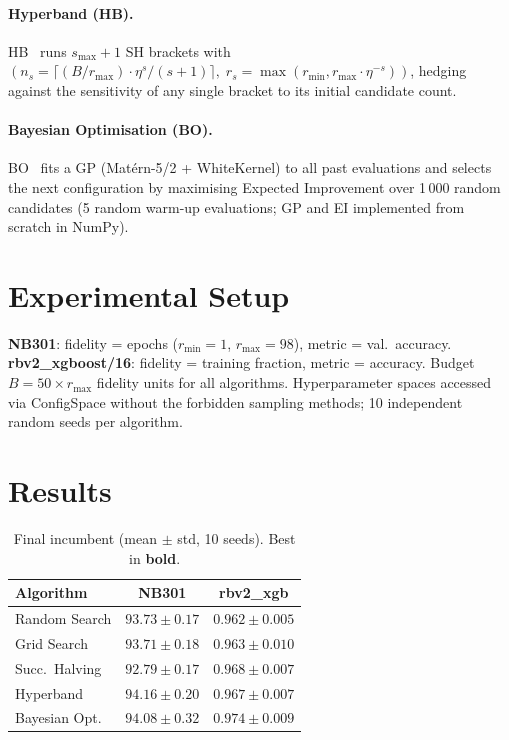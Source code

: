 \documentclass{AIM_report}
\begin{document}
\paragraph{Hyperband (HB).}
HB~\cite{li2018hyperband} runs $s_{\max}{+}1$ SH brackets with
$(n_s{=}\lceil(B/r_{\max})\cdot\eta^s/(s{+}1)\rceil,\;
r_s{=}\max(r_{\min}, r_{\max}{\cdot}\eta^{-s}))$,
hedging against the sensitivity of any single bracket to its initial
candidate count.

\paragraph{Bayesian Optimisation (BO).}
BO~\cite{snoek2012practical} fits a GP (Mat\'{e}rn-5/2 + WhiteKernel)
to all past evaluations and selects the next configuration by maximising
Expected Improvement over 1\,000 random candidates (5 random warm-up
evaluations; GP and EI implemented from scratch in NumPy).

\section{Experimental Setup}

\textbf{NB301}: fidelity = epochs ($r_{\min}{=}1$, $r_{\max}{=}98$),
metric = val.\ accuracy.
\textbf{rbv2\_xgboost/16}: fidelity = training fraction, metric = accuracy.
Budget $B{=}50{\times}r_{\max}$ fidelity units for all algorithms.
Hyperparameter spaces accessed via ConfigSpace without the forbidden
sampling methods; 10 independent random seeds per algorithm.

\section{Results}

\begin{table}[h]
  \centering
  \renewcommand{\tabcolsep}{4pt}
  \renewcommand{\arraystretch}{1.05}
  \caption{Final incumbent (mean $\pm$ std, 10 seeds). Best in \textbf{bold}.}
  \label{tab:results}
  \small
  \begin{tabular}{lcc}
    \toprule
    \textbf{Algorithm} & \textbf{NB301} & \textbf{rbv2\_xgb} \\
    \midrule
    Random Search    & $93.73 \pm 0.17$ & $0.962 \pm 0.005$ \\
    Grid Search      & $93.71 \pm 0.18$ & $0.963 \pm 0.010$ \\
    Succ.\ Halving   & $92.79 \pm 0.17$ & $0.968 \pm 0.007$ \\
    Hyperband        & $\mathbf{94.16 \pm 0.20}$ & $0.967 \pm 0.007$ \\
    Bayesian Opt.    & $94.08 \pm 0.32$ & $\mathbf{0.974 \pm 0.009}$ \\
    \bottomrule
  \end{tabular}
\end{table}
\end{document}
